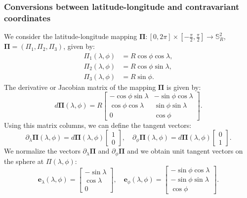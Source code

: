 \subsubsection{Conversions between latitude-longitude and contravariant coordinates}
\label{anexo-sph-ll}
We consider the latitude-longitude mapping 
$\boldsymbol{\Pi}: [0,2\pi] \times [-\frac{\pi}{2},\frac{\pi}{2}] \to \mathbb{S}^2_R$, 
$\boldsymbol{\Pi} = ({\Pi}_1,{\Pi}_2,{\Pi}_3)$, given by:
\begin{align}
	\label{ll2sph}
	{\Pi}_1(\lambda,\phi) &= R\cos \phi \cos \lambda,\\
	{\Pi}_2(\lambda,\phi) &= R\cos \phi \sin \lambda,\\
	{\Pi}_3(\lambda,\phi) &= R\sin \phi.
\end{align}
The derivative or Jacobian matrix of the mapping $\boldsymbol{\Pi}$ is given by:
\begin{equation}
	\label{dpsi}
	d\boldsymbol{\Pi} (\lambda,\phi) = 
	R \begin{bmatrix}
		-\cos \phi \sin \lambda &  -\sin \phi \cos \lambda \\
		\cos \phi \cos \lambda & \sin \phi \sin \lambda \\
		0  &  \cos \phi
	\end{bmatrix}.
\end{equation}
Using this matrix columns, we can define the tangent vectors:
\begin{equation}
	\partial_{\lambda}\boldsymbol{\Pi}(\lambda,\phi) = d\boldsymbol{\Pi}(\lambda,\phi)
	\begin{bmatrix}
		1 \\
		0
	\end{bmatrix}, \quad
	\partial_{\phi}\boldsymbol{\Pi}(\lambda,\phi) = d\boldsymbol{\Pi}(\lambda,\phi)
	\begin{bmatrix}
		0 \\
		1
	\end{bmatrix}.
\end{equation}
We normalize the vectors $\partial_{\lambda}\boldsymbol{\Pi}$ and $\partial_{\phi}\boldsymbol{\Pi}$
and we obtain unit tangent vectors on the sphere at $\Pi(\lambda, \phi)$:
\begin{equation}
	\label{latlon_tg_vectors}
	\boldsymbol{e}_{\lambda}(\lambda,\phi) = 
	\begin{bmatrix}
		-\sin \lambda \\
		\cos \lambda \\
		0
	\end{bmatrix}, \quad
	\boldsymbol{e}_{\phi}(\lambda,\phi) =
	\begin{bmatrix}
		-\sin \phi \cos \lambda \\
		-\sin \phi \sin \lambda \\
		\cos \phi
	\end{bmatrix}.
\end{equation}
